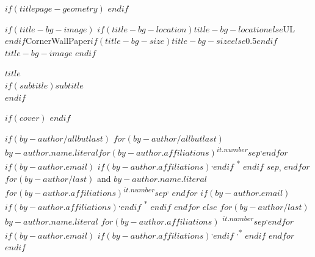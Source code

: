 
$if(titlepage-geometry)$
$endif$
\begin{minipage}[b][\textheight][s]{\textwidth}


\raggedright


$if(title-bg-image)$
\This$if(title-bg-location)$$title-bg-location$$else$UL$endif$CornerWallPaper{$if(title-bg-size)$$title-bg-size$$else$0.5$endif$}{$title-bg-image$}
$endif$


{\huge\bfseries\nohyphens{$title$}}\\[1\baselineskip]

$if(subtitle)${\large{$subtitle$}}\\[4\baselineskip]$endif$

\vspace{2\baselineskip}

$if(cover)$
$endif$

\vspace{1\baselineskip}

$if(by-author/allbutlast)$
$for(by-author/allbutlast)$
 {\large{$by-author.name.literal$}}$for(by-author.affiliations)${\textsuperscript{$it.number$}}$sep$\textsuperscript{,}$endfor$%
$if(by-author.email)$%
$if(by-author.affiliations)$\textsuperscript{,}$endif$%
{\textsuperscript{*}}%
$endif$%
$sep$,
$endfor$
$for(by-author/last)$%
{ and \large{$by-author.name.literal$}}%
$for(by-author.affiliations)${\textsuperscript{$it.number$}}$sep$\textsuperscript{,}%
$endfor$%
$if(by-author.email)$%
$if(by-author.affiliations)$\textsuperscript{,}$endif$%
{\textsuperscript{*}}%
$endif$%
$endfor$
$else$
$for(by-author/last)$%
{\large{$by-author.name.literal$}}%
$for(by-author.affiliations)$%
{\textsuperscript{$it.number$}}$sep$\textsuperscript{,}$endfor$%
$if(by-author.email)$%
$if(by-author.affiliations)$\textsuperscript{,}$endif$%
{\textsuperscript{,*}}%
$endif$%
$endfor$
$endif$


\end{minipage}
